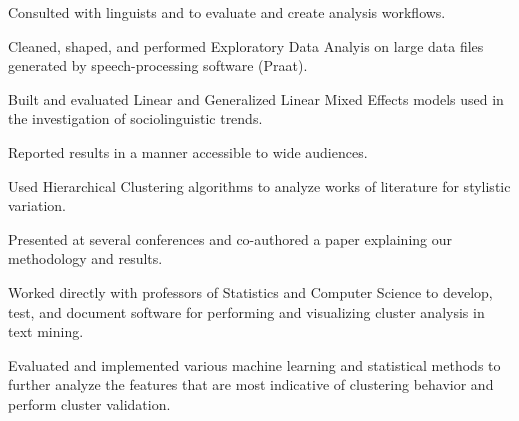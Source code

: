 \documentclass[letterpaper]{deedy-resume} %
\begin{document}
\begin{minipage}[t]{0.63\textwidth}

\begin{tightitemize}
\item Consulted with linguists and to evaluate and create analysis workflows.
\item Cleaned, shaped, and performed Exploratory Data Analyis on
  large data files generated by speech-processing software (Praat).
\item Built and evaluated Linear and Generalized Linear Mixed Effects
  models used in the
  investigation of sociolinguistic trends.
\item Reported results in a manner accessible to wide audiences.
\end{tightitemize}

\sectionspace %


\begin{tightitemize}
\item Used Hierarchical Clustering algorithms to analyze
  works of literature  for stylistic variation.
\item Presented at several conferences and co-authored a paper
  explaining our methodology and results.
\end{tightitemize}

\sectionspace %


\begin{tightitemize}
\item Worked directly with professors of Statistics and Computer Science to
  develop, test, and document software for performing and visualizing
  cluster analysis in text mining.
\item Evaluated and implemented various machine learning and statistical
  methods to further analyze the features that are most indicative of
  clustering behavior and perform cluster validation.
\end{tightitemize}


\end{minipage}
\end{document}
